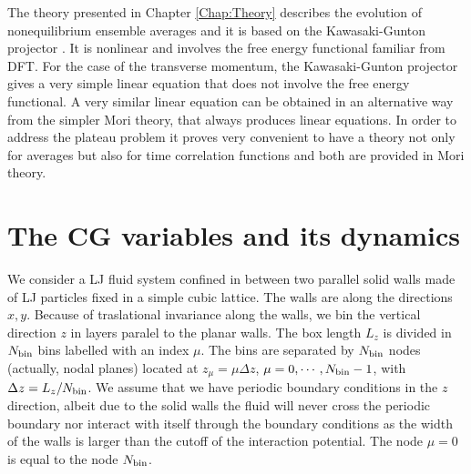 \documentclass[b5paper,openright,10pt]{book}
\begin{document}
The  theory presented  in Chapter \ref{Chap:Theory} describes  the
evolution of nonequilibrium ensemble averages  and it is based on the
Kawasaki-Gunton  projector \cite{Grabert1982}.   It is  nonlinear and
involves the  free energy functional familiar  from DFT.  For the case of  the transverse momentum, the Kawasaki-Gunton
projector gives  a very simple  linear equation that does  not involve
the free  energy functional.   A very similar  linear equation  can be
obtained  in an  alternative way  from the  simpler Mori  theory, that
always produces  linear equations.   In order  to address  the plateau
problem  it proves  very  convenient to  have a  theory  not only  for
averages but also for time correlation functions and both are provided
in Mori theory.  


\section{The CG variables and its dynamics}

\label{Sec:CGWALLS}
We  consider a  LJ  fluid system  confined  in between  two
parallel solid walls made of LJ particles fixed in a simple
cubic lattice. The  walls are along the directions  $x,y$.  Because of
traslational invariance along the walls, we bin the vertical direction
$z$ in  layers paralel to the  planar walls.  The box  length $L_z$ is
divided in $N_{\rm bin}$ bins labelled  with an index $\mu$.  The bins
are separated by $N_{\rm bin}$  nodes (actually, nodal planes) located
at  $z_\mu=\mu \Delta  z$, $\mu=0,\cdots,N_{\rm  bin}-1$, with  $\Delta
z=L_z/N_{\rm  bin}$.   We  assume   that  we  have  periodic  boundary
conditions in  the $z$ direction,  albeit due  to the solid  walls the
fluid will never cross the  periodic boundary nor interact with itself
through the  boundary conditions as the  width of the walls  is larger
than the  cutoff of  the interaction potential.   The node  $\mu=0$ is
equal to  the node  $N_{\rm bin}$.   
\end{document}
